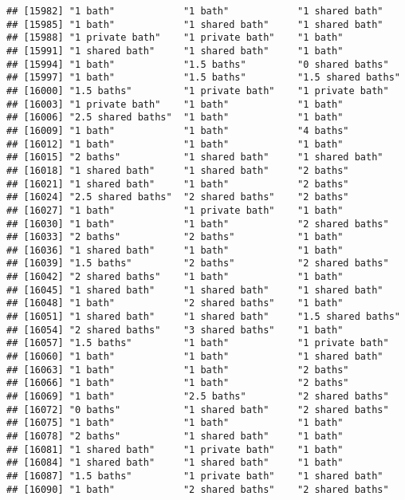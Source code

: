 \documentclass[
]{article}
\begin{document}
\begin{verbatim}
## [15982] "1 bath"            "1 bath"            "1 shared bath"    
## [15985] "1 bath"            "1 shared bath"     "1 shared bath"    
## [15988] "1 private bath"    "1 private bath"    "1 bath"           
## [15991] "1 shared bath"     "1 shared bath"     "1 bath"           
## [15994] "1 bath"            "1.5 baths"         "0 shared baths"   
## [15997] "1 bath"            "1.5 baths"         "1.5 shared baths" 
## [16000] "1.5 baths"         "1 private bath"    "1 private bath"   
## [16003] "1 private bath"    "1 bath"            "1 bath"           
## [16006] "2.5 shared baths"  "1 bath"            "1 bath"           
## [16009] "1 bath"            "1 bath"            "4 baths"          
## [16012] "1 bath"            "1 bath"            "1 bath"           
## [16015] "2 baths"           "1 shared bath"     "1 shared bath"    
## [16018] "1 shared bath"     "1 shared bath"     "2 baths"          
## [16021] "1 shared bath"     "1 bath"            "2 baths"          
## [16024] "2.5 shared baths"  "2 shared baths"    "2 baths"          
## [16027] "1 bath"            "1 private bath"    "1 bath"           
## [16030] "1 bath"            "1 bath"            "2 shared baths"   
## [16033] "2 baths"           "2 baths"           "1 bath"           
## [16036] "1 shared bath"     "1 bath"            "1 bath"           
## [16039] "1.5 baths"         "2 baths"           "2 shared baths"   
## [16042] "2 shared baths"    "1 bath"            "1 bath"           
## [16045] "1 shared bath"     "1 shared bath"     "1 shared bath"    
## [16048] "1 bath"            "2 shared baths"    "1 bath"           
## [16051] "1 shared bath"     "1 shared bath"     "1.5 shared baths" 
## [16054] "2 shared baths"    "3 shared baths"    "1 bath"           
## [16057] "1.5 baths"         "1 bath"            "1 private bath"   
## [16060] "1 bath"            "1 bath"            "1 shared bath"    
## [16063] "1 bath"            "1 bath"            "2 baths"          
## [16066] "1 bath"            "1 bath"            "2 baths"          
## [16069] "1 bath"            "2.5 baths"         "2 shared baths"   
## [16072] "0 baths"           "1 shared bath"     "2 shared baths"   
## [16075] "1 bath"            "1 bath"            "1 bath"           
## [16078] "2 baths"           "1 shared bath"     "1 bath"           
## [16081] "1 shared bath"     "1 private bath"    "1 bath"           
## [16084] "1 shared bath"     "1 shared bath"     "1 bath"           
## [16087] "1.5 baths"         "1 private bath"    "1 shared bath"    
## [16090] "1 bath"            "2 shared baths"    "2 shared baths"   

\end{verbatim}
\end{document}
